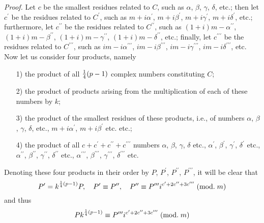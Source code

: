 \documentclass[twoside,12pt, showframe]{memoir}
\renewcommand{\pmod}[1]{\;(\textrm{mod.}\;#1)}
\let\oldfrac\frac
\def\frac#1#2{\mathchoice{\tfrac{#1}{#2}}{\oldfrac{#1}{#2}}{\genfrac{}{}{}{2}{#1}{#2\mathstrut}}{\genfrac{}{}{}{3}{#1}{#2\mathstrut}}}
\begin{document}
\textit{Proof.} Let \(c\) be the smallest residues related to \(C\), such as \(\alpha\), \( \beta\), \( \gamma\), \( \delta\), etc.; then let \(c^{\prime}\) be the residues related to \(C^{\prime}\), such as \(m+i \alpha^{\prime}\), \( m+i \beta^{\prime}\), \( m+i \gamma^{\prime}\), \( m+i \delta^{\prime}\), etc.; furthermore, let \(c^{\prime \prime}\) be the residues related to \(C^{\prime \prime}\), such as \((1+i) m-\alpha^{\prime \prime}\), \((1+i) m-\beta^{\prime \prime}\), \((1+i) m-\gamma^{\prime \prime}\), \((1+i) m-\delta^{\prime \prime}\), etc.; finally, let \(c^{\prime \prime \prime}\) be the residues related to \(C^{\prime \prime \prime}\), such as \(i m-i \alpha^{\prime \prime \prime}\), \( i m-i \beta^{\prime \prime \prime}\), \(i m-i \gamma^{\prime \prime \prime}\), \( i m-i \delta^{\prime \prime \prime}\), etc. Now let us consider four products, namely
\begin{enumerate}
\item[1)] the product of all \(\frac{1}{4}(p-1)\) complex numbers constituting \(C\);
\item[2)] the product of products arising from the multiplication of each of these numbers by \(k\);
\item[3)] the product of the smallest residues of these products, i.e., of numbers \(\alpha\), \( \beta\), \( \gamma\), \( \delta\), etc., \(m+i \alpha^{\prime}\), \( m+i \beta^{\prime}\) etc. etc.;
\item[4)] the product of all \(c+c^{\prime}+c^{\prime \prime}+c^{\prime \prime \prime}\) numbers \(\alpha\), \( \beta\), \( \gamma\), \( \delta\) etc., \(\alpha^{\prime}\), \( \beta^{\prime}\), \( \gamma^{\prime}\), \( \delta^{\prime}\) etc., \(\alpha^{\prime \prime}\), \( \beta^{\prime \prime}\), \( \gamma^{\prime \prime}\), \( \delta^{\prime \prime}\) etc., \(\alpha^{\prime \prime \prime}\), \( \beta^{\prime \prime \prime}\), \( \gamma^{\prime \prime \prime}\), \( \delta^{\prime \prime \prime}\) etc.
\end{enumerate}
Denoting these four products in their order by \(P\), \( P^{\prime} \), \( P^{\prime \prime}\), \( P^{\prime \prime \prime}\), it will be clear that
\[P^{\prime}=k^{\frac{1}{4}(p-1)} P, \quad P^{\prime} \equiv P^{\prime \prime}, \quad P^{\prime \prime} \equiv P^{\prime \prime \prime} i^{c^{\prime}+2 c^{\prime \prime}+3 c^{\prime \prime \prime}}\pmod{m}\]
and thus
\[P k^{\frac{1}{4}(p-1)} \equiv P^{\prime \prime \prime} i^{c^{\prime}+2 c^{\prime \prime}+3 c^{\prime \prime \prime}}\pmod{m}\]
\end{document}
